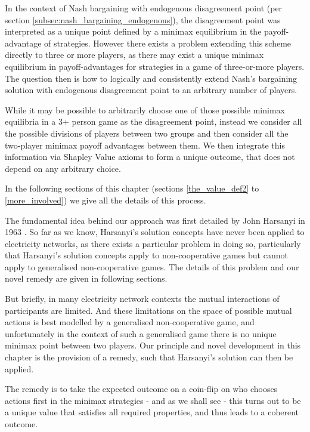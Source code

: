 In the context of Nash bargaining with endogenous disagreement point (per section \ref{subsec:nash_bargaining_endogenous}), the disagreement point was interpreted as a unique point defined by a minimax equilibrium in the payoff-advantage of strategies.
However there exists a problem extending this scheme directly to three or more players, as there may exist a unique minimax equilibrium in payoff-advantages for strategies in a game of three-or-more players.
The question then is how to logically and consistently extend Nash's bargaining solution with endogenous disagreement point to an arbitrary number of players.

While it may be possible to arbitrarily choose one of those possible minimax equilibria in a 3+ person game as the disagreement point, 
instead we consider all the possible divisions of players between two groups and then consider all the two-player minimax payoff advantages between them. We then integrate this information via Shapley Value axioms to form a unique outcome, that does not depend on any arbitrary choice.

In the following sections of this chapter (sections \ref{the_value_def2} to \ref{more_involved}) we give all the details of this process.%

The fundamental idea behind our approach was first detailed by John Harsanyi in 1963 \cite{values3}.
So far as we know, Harsanyi's solution concepts have never been applied to electricity networks, as there exists a particular problem in doing so, particularly that Harsanyi's solution concepts apply to non-cooperative games but cannot apply to generalised non-cooperative games.
The details of this problem and our novel remedy are given in following sections.

But briefly, in many electricity network contexts the mutual interactions of participants are limited.
And these limitations on the space of possible mutual actions is best modelled by a generalised non-cooperative game, and unfortunately in the context of such a generalised game there is no unique minimax point between two players.
Our principle and novel development in this chapter is the provision of a remedy, such that Harsanyi's solution can then be applied.

The remedy is to take the expected outcome on a coin-flip on who chooses actions first in the minimax strategies - and as we shall see - this turns out to be a unique value that satisfies all required properties, and thus leads to a coherent outcome.


